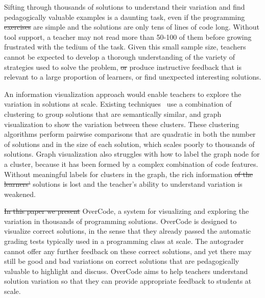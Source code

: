 \documentclass[12pt,twoside]{mitthesis}
\providecommand{\DIFaddtex}[1]{{\protect\color{blue}\uwave{#1}}} %
\providecommand{\DIFdeltex}[1]{{\protect\color{red}\sout{#1}}}                      %
\providecommand{\DIFaddbegin}{} %
\providecommand{\DIFaddend}{} %
\providecommand{\DIFdelbegin}{} %
\providecommand{\DIFdelend}{} %
\providecommand{\DIFadd}[1]{\texorpdfstring{\DIFaddtex{#1}}{#1}} %
\providecommand{\DIFdel}[1]{\texorpdfstring{\DIFdeltex{#1}}{}} %
\begin{document}
Sifting through thousands of solutions to understand their variation and find pedagogically valuable examples is a daunting task, even if the programming \DIFdelbegin \DIFdel{exercises }\DIFdelend \DIFaddbegin \DIFadd{problems }\DIFaddend are simple and the solutions are only tens of lines of code long. Without tool support, a teacher may not read more than 50-100 of them before growing frustrated with the tedium of the task. Given this small sample size, teachers cannot be expected to develop a thorough understanding of the variety of strategies used to solve the problem, \DIFdelbegin \DIFdel{or }\DIFdelend produce instructive feedback that is relevant to a large proportion of learners, or find unexpected interesting solutions.

An information visualization approach would enable teachers to explore the variation in solutions at scale. Existing techniques~\cite{gradingsigcse14,MOOCshop,codewebs} use a combination of clustering to group solutions that are semantically similar, and graph visualization to show the variation between these clusters. These clustering algorithms perform pairwise comparisons that are quadratic in both the number of solutions and in the size of each solution, which scales poorly to thousands of solutions. Graph visualization also struggles with how to label the graph node for a cluster, because it has been formed by a complex combination of code features. Without meaningful labels for clusters in the graph, the rich information \DIFdelbegin \DIFdel{of the learners' }\DIFdelend \DIFaddbegin \DIFadd{in student }\DIFaddend solutions is lost and the teacher's ability to understand variation is weakened.

\DIFdelbegin \DIFdel{In this paper we present }\DIFdelend \DIFaddbegin \DIFadd{This chapter presents }\DIFaddend OverCode, a system for visualizing and exploring the variation in thousands of programming solutions. OverCode is designed to visualize correct solutions, in the sense that they already passed the automatic grading tests typically used in a programming class at scale. The autograder cannot offer any further feedback on these correct solutions, and yet there may still be good and bad variations on correct solutions that are pedagogically valuable to highlight and discuss. OverCode aims to help teachers understand solution variation so that they can provide appropriate feedback to students at scale.
\end{document}
